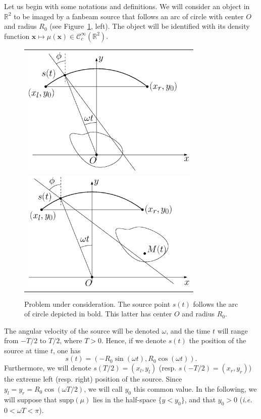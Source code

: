 \documentclass[twocolumn]{IEEEtran}
\numberwithin{equation}{section}
\newcommand{\R}{\mathbb{R}}
\newcommand{\ie}{\emph{i.e.} }
\newcommand{\Ccinf}{\mathcal{C}_c^{\infty}}
\newcommand{\supp}{\textrm{supp}}
\begin{document}
Let us begin with some notations and definitions. We will consider an object in $\R^2$ to be imaged by a fanbeam source that follows an arc of circle with center $O$ and radius $R_0$ (see Figure~\ref{fig:notations}, left). The object will be identified with its density function $\mathbf{x} \mapsto \mu(\mathbf{x}) \in \Ccinf(\R^2)$.
\begin{figure}[!ht]
	\centering
	\begin{tabular}{c}
	\includegraphics[width=85mm]{figs/frame_scanner_still.eps} \\
	\includegraphics[width=85mm]{figs/frame_scanner.eps}
	\end{tabular}
	\caption{Problem under consideration. The source point $s(t)$ follows the arc of circle depicted in bold. This latter has center $O$ and radius $R_0$.\label{fig:notations}}
\end{figure}
The angular velocity of the source will be denoted $\omega$, and the time $t$ will range from $-T/2$ to $T/2$, where $T>0$. Hence, if we denote $s(t)$ the position of the source at time $t$, one has
\begin{equation}
	s(t) = \left( -R_0 \sin(\omega t), R_0 \cos(\omega t) \right).
\label{eq:source_position}
\end{equation}
Furthermore, we will denote $s(T/2)=(x_l,y_l)$ (resp. $s(-T/2)=(x_r,y_r)$) the extreme left (resp. right) position of the source. Since $y_l = y_r = R_0 \cos(\omega T/2)$, we will call $y_0$ this common value. In the following, we will suppose that $\supp(\mu)$ lies in the half-space $\{ y < y_0 \}$, and that $y_0 > 0$ (\ie $0 < \omega T < \pi$).
\end{document}
